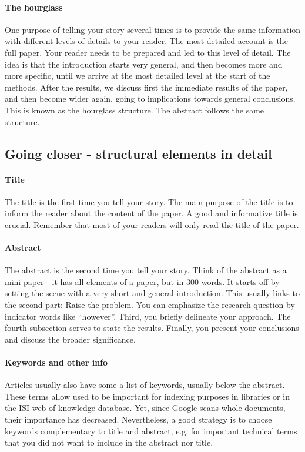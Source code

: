 \documentclass{tufte-book}
\begin{document}
\paragraph{The hourglass} One purpose of telling your story several times is to provide the same information with different levels of details to your reader. The most detailed account is the full paper. Your reader needs to be prepared and led to this level of detail. The idea is that the introduction starts very general, and then becomes more and more specific, until we arrive at the most detailed level at the start of the methods. After the results, we discuss first the immediate results of the paper, and then become wider again, going to implications towards general conclusions. This is known as the hourglass structure. The abstract follows the same structure. 
 
\subsection{Going closer - structural elements in detail}

\paragraph{Title} The title is the first time you tell your story. The main purpose of the title is to inform the reader about the content of the paper. A good and informative title is crucial. Remember that most of your readers will only read the title of the paper.

\paragraph{Abstract}The abstract is the second time you tell your story. Think of the abstract as a mini paper - it has all elements of a paper, but in 300 words. It starts off by setting the scene with a very short and general introduction. This usually links to the second part: Raise the problem. You can emphasize the research question by indicator words like ``however''. Third, you briefly delineate your approach. The fourth subsection serves to state the results. Finally, you present your conclusions and discuss the broader significance.\\

\paragraph{Keywords and other info}Articles usually also have some a list of keywords, usually below the abstract. These terms allow used to be important for indexing purposes in libraries or in the ISI web of knowledge database. Yet, since Google scans whole documents, their importance has decreased. Nevertheless, a good strategy is to choose keywords complementary to title and abstract, e.g. for important technical terms that you did not want to include in the abstract nor title.
\end{document}
